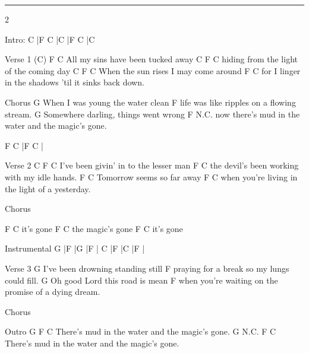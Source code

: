 \noindent\rule{\columnwidth}{1pt}

\begin{multicols}{2}
\begin{lstsong}
Intro: C   |F C  |C   |F C  |C
 
Verse 1
(C)                   F      C
All my sins have been tucked away
C                            F      C
hiding from the light of the coming day
C                        F    C
When the sun rises I may come around
                                    F          C
for I linger in the shadows 'til it sinks back down.
 
Chorus
G
When I was young the water clean
F
life was like ripples on a flowing stream.
G
Somewhere darling, things went wrong
F  N.C.
now there's mud in the water and the magic's gone.
 
F C  |F C  |
 
Verse 2
          C                F      C
I've been givin' in to the lesser man
                              F       C
the devil's been working with my idle hands.
                  F   C
Tomorrow seems so far away
                                     F     C
when you're living in the light of a yesterday.

Chorus
 
F    C
it's gone
    F       C
the magic's gone
F    C
it's gone
\end{lstsong}
\columnbreak
\begin{lstsong}
Instrumental
G   |F   |G   |F   |
C   |F   |C   |F   |
 
Verse 3
G
I've been drowning standing still
F
praying for a break so my lungs could fill.
G
Oh good Lord this road is mean
F
when you're waiting on the promise of a dying dream.

Chorus

Outro
G                                F       C
There's mud in the water and the magic's gone.
G  N.C.                          F       C
There's mud in the water and the magic's gone.
\end{lstsong}
\end{multicols}
\newpage



